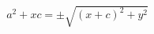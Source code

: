 \documentclass[preview]{standalone}
\begin{document}
\begin{align*}
a^2 + xc = \pm \sqrt{(x+c)^2+y^2}
\end{align*}
\end{document}
